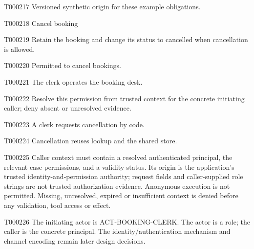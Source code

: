 \documentclass[11pt,a4paper]{article}
\begin{document}
\begin{atlasparagraph}{T000217}
Versioned synthetic origin for these example obligations.
\end{atlasparagraph}
\begin{atlastext}{T000218}
Cancel booking
\end{atlastext}
\begin{atlasparagraph}{T000219}
Retain the booking and change its status to cancelled when cancellation is allowed.
\end{atlasparagraph}
\begin{atlastext}{T000220}
Permitted to cancel bookings.
\end{atlastext}
\begin{atlasparagraph}{T000221}
The clerk operates the booking desk.
\end{atlasparagraph}
\begin{atlasparagraph}{T000222}
Resolve this permission from trusted context for the concrete initiating caller; deny absent or unresolved evidence.
\end{atlasparagraph}
\begin{atlasparagraph}{T000223}
A clerk requests cancellation by code.
\end{atlasparagraph}
\begin{atlasparagraph}{T000224}
Cancellation reuses lookup and the shared store.
\end{atlasparagraph}
\begin{atlasparagraph}{T000225}
Caller context must contain a resolved authenticated principal, the relevant case permissions, and a validity status. Its origin is the application's trusted identity-and-permission authority; request fields and caller-supplied role strings are not trusted authorization evidence. Anonymous execution is not permitted. Missing, unresolved, expired or insufficient context is denied before any validation, tool access or effect.
\end{atlasparagraph}
\begin{atlasparagraph}{T000226}
The initiating actor is ACT-BOOKING-CLERK. The actor is a role; the caller is the concrete principal. The identity/authentication mechanism and channel encoding remain later design decisions.
\end{atlasparagraph}
\end{document}
